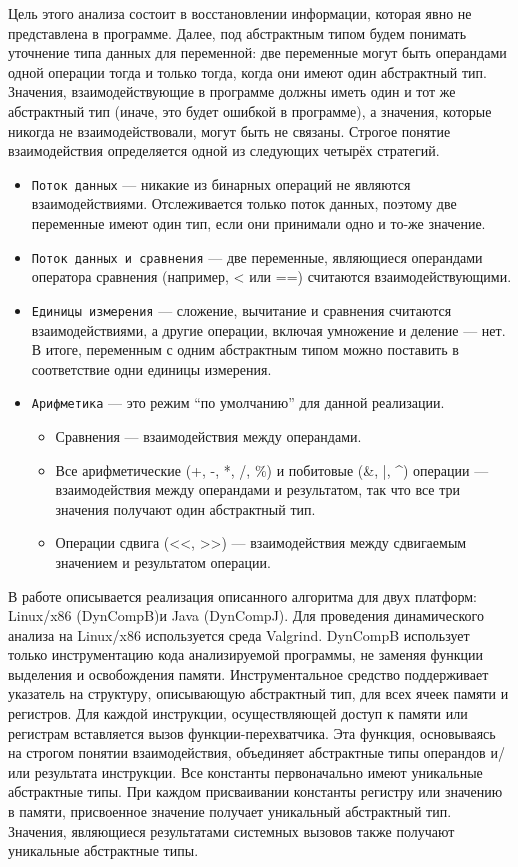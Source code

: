 \documentclass[a4paper,12pt,russian]{article}
\newcommand{\code}[1]{\textsf{#1}}
\begin{document}
Цель этого анализа состоит в восстановлении информации, которая явно не представлена в программе.
Далее, под абстрактным типом будем понимать уточнение типа данных для переменной: две переменные могут быть операндами одной операции тогда и только тогда, когда они имеют один абстрактный тип.
Значения, взаимодействующие в программе должны иметь один и тот же абстрактный тип (иначе, это будет ошибкой в программе), а значения, которые никогда не взаимодействовали, могут быть не связаны.
Строгое понятие взаимодействия определяется одной из следующих четырёх стратегий.
\begin{itemize}
\item \texttt{Поток данных} --- никакие из бинарных операций не являются взаимодействиями. Отслеживается только поток данных, поэтому две переменные имеют один тип, если они принимали одно и то-же значение.
\item \texttt{Поток данных и сравнения} --- две переменные, являющиеся операндами оператора сравнения (например, \code{<} или \code{==}) считаются взаимодействующими.
\item \texttt{Единицы измерения} --- сложение, вычитание и сравнения считаются взаимодействиями, а другие операции, включая умножение и деление --- нет. В итоге, переменным с одним абстрактным типом можно поставить в соответствие одни единицы измерения.
\item \texttt{Арифметика} --- это режим ``по умолчанию'' для данной реализации.
  \begin{itemize}
    \item Сравнения --- взаимодействия между операндами.
    \item Все арифметические (\code{+}, \code{-}, \code{*}, \code{/}, \code{\%}) и побитовые (\code{\&}, \code{|}, \code{\^}) операции --- взаимодействия между операндами и результатом, так что все три значения получают один абстрактный тип.
    \item Операции сдвига (\code{<}\code{<}, \code{>}\code{>}) --- взаимодействия между сдвигаемым значением и результатом операции.
  \end{itemize}
\end{itemize}

В работе описывается реализация описанного алгоритма для двух платформ: \code{Linux/x86} (\code{DynCompB})и \code{Java} (\code{DynCompJ}).
Для проведения динамического анализа на \code{Linux/x86} используется среда \code{Valgrind}.
\code{DynCompB} использует только инструментацию кода анализируемой программы, не заменяя функции выделения и освобождения памяти.
Инструментальное средство поддерживает указатель на структуру, описывающую абстрактный тип, для всех ячеек памяти и регистров.
Для каждой инструкции, осуществляющей доступ к памяти или регистрам вставляется вызов функции-перехватчика.
Эта функция, основываясь на строгом понятии взаимодействия, объединяет абстрактные типы операндов и/или результата инструкции.
Все константы первоначально имеют уникальные абстрактные типы.
При каждом присваивании константы регистру или значению в памяти, присвоенное значение получает уникальный абстрактный тип.
Значения, являющиеся результатами системных вызовов также получают уникальные абстрактные типы.
\end{document}
